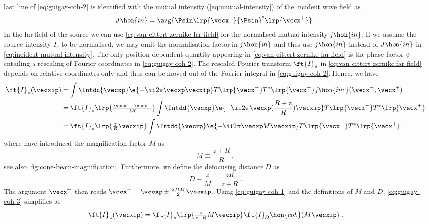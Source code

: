 \documentclass[
twoside,
openright,
titlepage,
numbers=noenddot,
headinclude,
fleqn,
a4paper,
footinclude=true,
cleardoublepage=empty,
abstractoff,
BCOR=5mm,
paper=a4,
fontsize=11pt,
british,ngerman,american,
]{scrreprt}
\begin{document}
last line of \cref{eq:guigay-coh-2} is identified with the mutual
intensity (\cref{eq:mutual-intensity}) of the incident wave field as
\begin{equation}
  \label{eq:incident-mutual-intensity}
    J\hon{in} = \avg{ \Psin\lrp{\vecx^-}{\Psin}^*\lrp{\vecx^+ } } \;.
\end{equation}
In the far field of the source we can use
\cref{eq:van-cittert-zernike-far-field} for the normalised mutual
intensity $j\hon{in}$.  If we assume the source intensity $I_s$ to be
normalised, we may omit the normalisation factor in $j\hon{in}$ and
thus use $j\hon{in}$ instead of $J\hon{in}$ in
\cref{eq:incident-mutual-intensity}.  The only position dependent
quantity appearing in \cref{eq:van-cittert-zernike-far-field} is the
phase factor $\psi$ entailing a rescaling of Fourier coordinates in
\cref{eq:guigay-coh-2}.  The rescaled Fourier transform $\ft{I}_s$ in
\cref{eq:van-cittert-zernike-far-field} depends on relative
coordinates only and thus can be moved out of the Fourier integral in
\cref{eq:guigay-coh-2}.  Hence, we have
\begin{equation}
  \label{eq:guigay-coh-3}
  \begin{split}
    \ft{I}_z(\vecxip) 
    & = \int \Intdd{\vecxp}\e{-\ii 2\pi\vecxp\vecxip} 
    T\lrp{\vecx^-}T^*\lrp{\vecx^+} j\hon{inc}(\vecx^-,\vecx^+)
    \\ &  = \ft{I}_s\lrp{\tfrac{\vecx^+-\vecx^-}{\lambda R}}
    \int\Intdd{\vecxp}\e{-\ii 2\pi\vecxp(\frac{R+z}{R})\vecxip} 
    T\lrp{\vecx^-}T^*\lrp{\vecx^+}
    \\ &  = \ft{I}_s\lrp{\tfrac{z}{R} \vecxip}
    \int\Intdd{\vecxp}\e{-\ii 2\pi\vecxp M \vecxip} 
    T\lrp{\vecx^-}T^*\lrp{\vecx^+} \;,
  \end{split}
\end{equation}
where have introduced the magnification factor $M$ as
\begin{equation}
  \label{eq:magnification}
   M \equiv \frac{z+R}{R} \;,
\end{equation}
see also \cref{fig:cone-beam-magnification}.  Furthermore, we define
the defocusing distance $D$ as
\begin{equation}
  \label{eq:defocus}
  D \equiv \frac{z}{M} = \frac{z R}{z + R} \;.
\end{equation}
The argument $\vecx^\pm$ then reads $\vecx^\pm\equiv\vecxp \pm
\tfrac{\lambda D M}{2}\vecxip$.  Using \cref{eq:guigay-coh-1} and the
definitions of $M$ and $D$, \cref{eq:guigay-coh-3} simplifies as
\begin{equation}
  \label{eq:guigay-incoherent}
    \ft{I}_z(\vecxip) = \ft{I}_s\lrp{\tfrac{z}{z+R} M\vecxip}
    \ft{I}_D\hon{coh}(M\vecxip) \;.
\end{equation}
\end{document}

